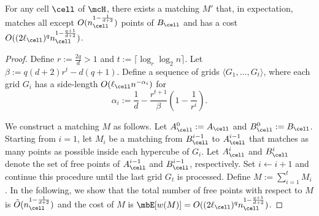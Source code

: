 \begin{lemma}\label{lemma:GRS-matching-d}
    For any cell $\cell$ of $\mcH$, there exists a matching $M'$ that, in expectation, matches all except $O(n_\cell^{1-\frac{1}{d+2}})$ points of $B_\cell$ and has a cost $O((2\ell_\cell)^q n_\cell^{1-\frac{q+1}{d+2}})$.
\end{lemma}
\begin{proof}
Define $r:= \frac{2q}{d}>1$ and $t:=\lceil \log_r \log_2 n\rceil$. Let $\beta:=q(d+2)r^t - d(q+1)$. Define a sequence of grids $\langle G_1, \ldots, G_t\rangle$, where each grid $G_i$ has a side-length $O(\ell_\cell n^{-\alpha_i})$ for \[\alpha_i:=\frac{1}{d} - \frac{r^{t+1}}{\beta}\left(1-\frac{1}{r^i}\right).\]

We construct a matching $M$ as follows.
Let $A_\cell^0:=A_\cell$ and $B_\cell^0:=B_\cell$. Starting from $i=1$, let $M_i$ be a matching from $B_\cell^{i-1}$ to $A_\cell^{i-1}$ that matches as many points as possible inside each hypercube of $G_i$. Let $A_\cell^i$ and $B_\cell^i$ denote the set of free points of $A_\cell^{i-1}$ and $B_\cell^{i-1}$, respectively. Set $i\leftarrow i+1$ and continue this procedure until the last grid $G_t$ is processed. Define $M:=\sum_{i=1}^t M_i$. 
In the following, we show that the total number of free points with respect to $M$ is $\tilde{O}(n_\cell^{1-\frac{1}{d+2}})$ and the cost of $M$ is $\mbE[w(M)]=O((2\ell_\cell)^qn_\cell^{1-\frac{q+1}{d+2}})$.


\end{proof}

